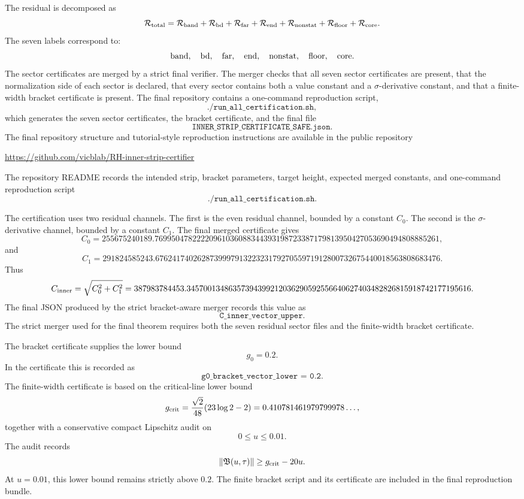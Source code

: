 \documentclass[11pt]{article}
\newcommand{\code}[1]{\texttt{#1}}
\newcommand{\RepoURL}{\url{https://github.com/vicblab/RH-inner-strip-certifier}}
\begin{document}
The residual is decomposed as
\[
        \mathcal R_{\rm total}
        =
        \mathcal R_{\rm band}
        +
        \mathcal R_{\rm bd}
        +
        \mathcal R_{\rm far}
        +
        \mathcal R_{\rm end}
        +
        \mathcal R_{\rm nonstat}
        +
        \mathcal R_{\rm floor}
        +
        \mathcal R_{\rm core}.
\]
The seven labels correspond to:
\[
        {\rm band},\quad
        {\rm bd},\quad
        {\rm far},\quad
        {\rm end},\quad
        {\rm nonstat},\quad
        {\rm floor},\quad
        {\rm core}.
\]
The sector certificates are merged by a strict final verifier.  The merger
checks that all seven sector certificates are present, that the normalization
side of each sector is declared, that every sector contains both a value
constant and a \(\sigma\)-derivative constant, and that a finite-width bracket
certificate is present.  The final repository contains a one-command
reproduction script,
\[
        \texttt{./run\_all\_certification.sh},
\]
which generates the seven sector certificates, the bracket certificate, and the
final file
\[
        \texttt{INNER\_STRIP\_CERTIFICATE\_SAFE.json}.
\]
The final repository structure and tutorial-style reproduction instructions are
available in the public repository
\begin{center}
\RepoURL
\end{center}
The repository README records the intended strip, bracket parameters, target
height, expected merged constants, and one-command reproduction script
\[
        \code{./run\_all\_certification.sh}.
\]

The certification uses two residual channels.  The first is the even residual
channel, bounded by a constant \(C_0\).  The second is the
\(\sigma\)-derivative channel, bounded by a constant \(C_1\).  The final
merged certificate gives
\[
        C_0
        =
        255675240189.76995047822220961036088344393198723387179813950427053690494808885261,
\]
and
\[
        C_1
        =
        291824585243.67624174026287399979132232317927055971912800732675440018563808683476.
\]
Thus
\[
        C_{\rm inner}
        =
        \sqrt{C_0^2+C_1^2}
        =
        387983784453.34570013486357394399212036290592556640627403482826815918742177195616.
\]
The final JSON produced by the strict bracket-aware merger records this value
as
\[
        \texttt{C\_inner\_vector\_upper}.
\]
The strict merger used for the final theorem requires both the seven residual
sector files and the finite-width bracket certificate. 

The bracket certificate supplies the lower bound
\[
        g_0=0.2.
\]
In the certificate this is recorded as
\[
        \texttt{g0\_bracket\_vector\_lower = 0.2}.
\]
The finite-width certificate is based on the critical-line lower bound
\[
        g_{\rm crit}
        =
        \frac{\sqrt2}{48}(23\log2-2)
        =
        0.410781461979799978\ldots,
\]
together with a conservative compact Lipschitz audit on
\[
        0\le u\le0.01.
\]
The audit records
\[
        \|\mathfrak B(u,\tau)\|
        \ge
        g_{\rm crit}-20u.
\]
At \(u=0.01\), this lower bound remains strictly above \(0.2\).  The finite
bracket script and its certificate are included in the final reproduction
bundle. 
\end{document}
